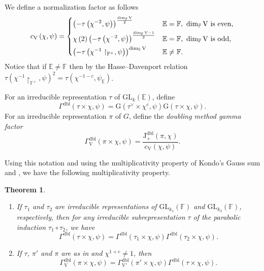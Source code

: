 \documentclass[12pt, reqno]{amsart}
\newtheorem{theorem}{Theorem}[section]
\theoremstyle{definition}
\theoremstyle{definition}
\theoremstyle{definition}
\newcommand{\multiplicativegroup}[1]{#1^{\times}}
\newcommand{\hermitianSpace}{\mathrm{V}}
\newcommand{\fieldCharacter}{\psi}
\newcommand{\Contragradient}[1]{#1^{\vee}}
\newcommand{\involution}[1]{#1^{c}}
\newcommand{\involutionPlusOne}[1]{#1^{1+c}}
\newcommand{\minusInvolutionMinusOne}[1]{#1^{-1-c}}
\newcommand{\GL}{\mathrm{GL}}
\newcommand{\finiteField}{\mathbb{F}}
\newcommand{\quadraticExtension}{\mathbb{E}}
\newcommand{\GaussSumSingleCharacter}[2]{\tau\left(#1, #2\right)}
\newcommand{\GaussSumScalar}[2]{\mathrm{G}\left(#1, #2\right)}
\newcommand{\posDblJacobiSumScalar}[2]{\mathrm{J}_{+}^{\mathrm{dbl}}\left(#1, #2\right)}
\newcommand{\dblGammaFactor}[3]{\Gamma^{\mathrm{dbl}}\left(#1 \times #2, #3\right)}
\newcommand{\dblGammaFactorSpace}[4]{\Gamma^{\mathrm{dbl}}_{#1}\left(#2 \times #3, #4\right)}
\begin{document}
We define a normalization factor as follows $$c_{\hermitianSpace}\left(\chi, \fieldCharacter\right) = \begin{dcases}
	\left(-\GaussSumSingleCharacter{\chi^{-2}}{\fieldCharacter}\right)^{\frac{\dim_{\finiteField} \hermitianSpace}{2}} & \quadraticExtension = \finiteField,\,\, \dim_{\finiteField} \hermitianSpace \text{ is even,}\\
	\chi\left(2\right) \left(-\GaussSumSingleCharacter{\chi^{-2}}{\fieldCharacter}\right)^{\frac{\dim_{\finiteField} \hermitianSpace - 1}{2}} & \quadraticExtension = \finiteField,\,\, \dim_{\finiteField} \hermitianSpace \text{ is odd,}	\\
	\left(-\GaussSumSingleCharacter{\chi^{-1}\restriction_{\multiplicativegroup{\finiteField}}}{\fieldCharacter}\right)^{\dim_{\quadraticExtension} \hermitianSpace} & \quadraticExtension \ne \finiteField.
\end{dcases}$$
Notice that if $\quadraticExtension \ne \finiteField$ then by the Hasse--Davenport relation $\GaussSumSingleCharacter{\chi^{-1}\restriction_{\multiplicativegroup{\finiteField}}}{\fieldCharacter}^{2} = \GaussSumSingleCharacter{\minusInvolutionMinusOne{\chi}} {\fieldCharacter_{\quadraticExtension}}$.

For an irreducible representation  $\tau$ of $\GL_k\left(\quadraticExtension\right)$, define $$\dblGammaFactor{\tau}{\chi}{\fieldCharacter} = \GaussSumScalar{\Contragradient{\tau} \times \involution{\chi}}{\fieldCharacter} \GaussSumScalar{\tau \times \chi}{\fieldCharacter}.$$
For an irreducible representation $\pi$ of $G$, define the \emph{doubling method gamma factor} $$\dblGammaFactorSpace{\hermitianSpace}{\pi}{\chi}{\fieldCharacter} = \frac{\posDblJacobiSumScalar{\pi}{\chi}}{c_{\hermitianSpace}\left(\chi, \fieldCharacter\right)}.$$

Using this notation and using the multiplicativity property of Kondo's Gauss sum and , we have the following multiplicativity property.

\begin{theorem}\label{thm:multiplicativity-in-terms-of-gamma-factors}
	\begin{enumerate}
		\item If $\tau_1$ and $\tau_2$ are irreducible representations of $\GL_{k_1}\left(\finiteField\right)$ and $\GL_{k_2}\left(\finiteField\right)$, respectively, then for any irreducible subrepresentation $\tau$ of the parabolic induction $\tau_1 \circ \tau_2$, we have
		$$\dblGammaFactor{\tau}{\chi}{\fieldCharacter} = \dblGammaFactor{\tau_1}{\chi}{\fieldCharacter} \dblGammaFactor{\tau_2}{\chi}{\fieldCharacter}.$$
		\item If $\tau$, $\pi'$ and $\pi$ are as in  and $\involutionPlusOne{\chi} \ne 1$, then
		$$\dblGammaFactorSpace{\hermitianSpace}{\pi}{\chi}{\fieldCharacter} = \dblGammaFactorSpace{\hermitianSpace'}{\pi'}{\chi}{\fieldCharacter} \dblGammaFactor{\tau}{\chi}{\fieldCharacter}.$$
	\end{enumerate}
\end{theorem}
\end{document}
